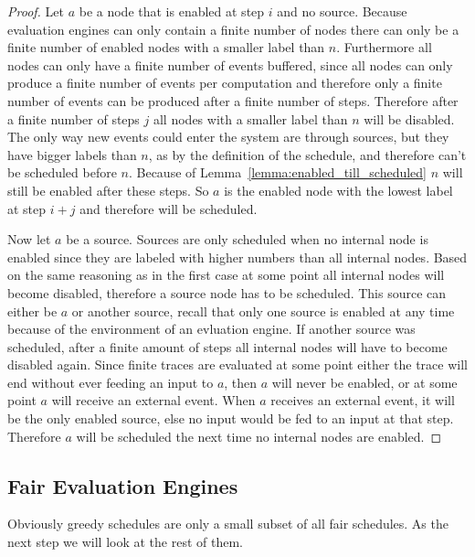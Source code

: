 \begin{proof}
  Let \(a\) be a node that is enabled at step \(i\) and no source.
  Because evaluation engines can only contain a finite number of nodes there can only be a finite number of enabled nodes with a smaller label than \(n\).
  Furthermore all nodes can only have a finite number of events buffered, since all nodes can only produce a finite number of events per computation and therefore only a finite number of events can be produced after a finite number of steps.
  Therefore after a finite number of steps \(j\) all nodes with a smaller label than \(n\) will be disabled.
  The only way new events could enter the system are through sources, but they have bigger labels than \(n\), as by the definition of the schedule, and therefore can't be scheduled before \(n\).
  Because of Lemma~\ref{lemma:enabled_till_scheduled} \(n\) will still be enabled after these steps.
  So \(a\) is the enabled node with the lowest label at step \(i + j\) and therefore will be scheduled.

  Now let \(a\) be a source.
  Sources are only scheduled when no internal node is enabled since they are labeled with higher numbers than all internal nodes.
  Based on the same reasoning as in the first case at some point all internal nodes will become disabled, therefore a source node has to be scheduled.
  This source can either be \(a\) or another source, recall that only one source is enabled at any time because of the environment of an evluation engine.
  If another source was scheduled, after a finite amount of steps all internal nodes will have to become disabled again.
  Since finite traces are evaluated at some point either the trace will end without ever feeding an input to \(a\), then \(a\) will never be enabled, or at some point \(a\) will receive an external event.
  When \(a\) receives an external event, it will be the only enabled source, else no input would be fed to an input at that step.
  Therefore \(a\) will be scheduled the next time no internal nodes are enabled.
\end{proof}


\subsection{Fair Evaluation Engines}
\label{sec:behaviours:behaviour_without_timing:fair}

Obviously greedy schedules are only a small subset of all fair schedules.
As the next step we will look at the rest of them.

